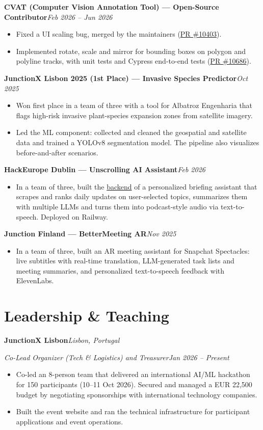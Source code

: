 \documentclass[11pt,a4paper]{article}
\newcommand{\entry}[2]{\Needspace{5\baselineskip}\textbf{#1}\hfill\textit{#2}\par\nopagebreak}
\newcommand{\role}[2]{\textit{#1}\hfill\textit{#2}\par\nopagebreak}
\begin{document}
\entry{CVAT (Computer Vision Annotation Tool) --- Open-Source Contributor}{Feb 2026 -- Jun 2026}
\begin{itemize}
    \item Fixed a UI scaling bug, merged by the maintainers (\href{https://github.com/cvat-ai/cvat/pull/10403}{PR \#10403}).
    \item Implemented rotate, scale and mirror for bounding boxes on polygon and polyline tracks, with unit tests and Cypress end-to-end tests (\href{https://github.com/cvat-ai/cvat/pull/10686}{PR \#10686}).
\end{itemize}

\entry{JunctionX Lisbon 2025 (1st Place) --- Invasive Species Predictor}{Oct 2025}
\begin{itemize}
    \item Won first place in a team of three with a tool for Albatroz Engenharia that flags high-risk invasive plant-species expansion zones from satellite imagery.
    \item Led the ML component: collected and cleaned the geospatial and satellite data and trained a YOLOv8 segmentation model. The pipeline also visualizes before-and-after scenarios.
\end{itemize}

\entry{HackEurope Dublin --- Unscrolling AI Assistant}{Feb 2026}
\begin{itemize}
    \item In a team of three, built the \href{https://github.com/DuarteCruz6/backend-hackeurope}{backend} of a personalized briefing assistant that scrapes and ranks daily updates on user-selected topics, summarizes them with multiple LLMs and turns them into podcast-style audio via text-to-speech. Deployed on Railway.
\end{itemize}

\entry{Junction Finland --- BetterMeeting AR}{Nov 2025}
\begin{itemize}
    \item In a team of three, built an AR meeting assistant for Snapchat Spectacles: live subtitles with real-time translation, LLM-generated task lists and meeting summaries, and personalized text-to-speech feedback with ElevenLabs.
\end{itemize}

\section*{Leadership \& Teaching}
\entry{JunctionX Lisbon}{Lisbon, Portugal}
\role{Co-Lead Organizer (Tech \& Logistics) and Treasurer}{Jan 2026 -- Present}
\begin{itemize}
    \item Co-led an 8-person team that delivered an international AI/ML hackathon for 150 participants (10--11 Oct 2026). Secured and managed a EUR 22,500 budget by negotiating sponsorships with international technology companies.
    \item Built the event website and ran the technical infrastructure for participant applications and event operations.
\end{itemize}
\end{document}
